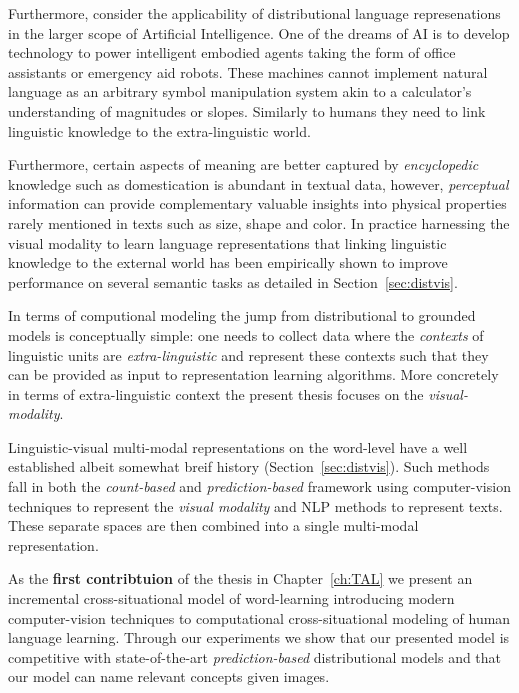Furthermore, consider the applicability of distributional language represenations in the larger scope of Artificial 
Intelligence. One of the dreams of AI is to develop technology to power intelligent embodied agents
taking the form of office assistants or emergency aid robots. These machines cannot implement natural
language as an arbitrary symbol manipulation system akin to a calculator's understanding of 
magnitudes or slopes. 
Similarly to humans they need to link linguistic knowledge to the extra-linguistic world. 

Furthermore, certain aspects of meaning are better captured by \emph{encyclopedic}
knowledge such as domestication is abundant in textual data, however, \emph{perceptual} information
can provide complementary valuable insights into physical properties rarely mentioned in texts such as size,
shape and color. In practice harnessing the visual modality to learn language
representations that linking linguistic knowledge
to the external world  has been empirically shown to improve performance on several semantic tasks as
detailed in Section~\ref{sec:distvis}.


In terms of computional modeling the jump from 
distributional to grounded models is conceptually simple: one needs to collect data where
the \emph{contexts} of linguistic units are \emph{extra-linguistic} and represent these contexts such
that they can be provided as input to representation learning algorithms.
More concretely in terms of extra-linguistic context the present thesis focuses on the \emph{visual-modality}.

Linguistic-visual multi-modal representations on the word-level have a well established albeit
somewhat breif history (Section~\ref{sec:distvis}). 
Such methods fall in both the \emph{count-based}
and \emph{prediction-based} framework using computer-vision techniques to represent the 
\emph{visual modality} and NLP methods to represent texts. 
These separate spaces are then combined into a single multi-modal representation.

As the \textbf{first contribtuion} of the thesis in Chapter~\ref{ch:TAL} we present an 
incremental cross-situational model of word-learning introducing modern computer-vision 
techniques to computational cross-situational modeling of  human language learning. 
Through our experiments we show that our presented model is competitive with state-of-the-art
\emph{prediction-based} distributional models and that our model can name 
relevant concepts given images.

